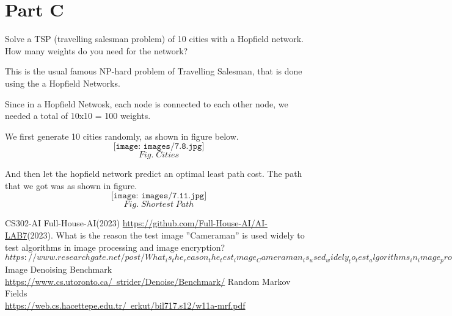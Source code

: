 \documentclass[conference]{IEEEtran}
\begin{document}
\section{Part C} 
Solve a TSP (travelling salesman problem) of 10 cities with
a Hopfield network. How many weights do you need for the
network?

This is the usual famous NP-hard problem of Travelling
Salesman, that is done using the a Hopfield Networks.

Since in a Hopfield Netwosk, each node is connected to
each other node, we needed a total of 10x10 = 100 weights.

We first generate 10 cities randomly, as shown in figure below.
$$\texttt{[image: images/7.8.jpg]}$$
$$Fig. \; Cities $$

And then let the hopfield network predict an optimal least
path cost.
The path that we got was as shown in figure.
$$\texttt{[image: images/7.11.jpg]}$$
$$Fig. \; Shortest \; Path $$
\begin{thebibliography}{}
\bibitem{}
CS302-AI Full-House-AI(2023) \href{https://github.com/Full-House-AI/AI-LAB7}{https://github.com/Full-House-AI/AI-LAB7}(2023).
\bibitem{}
What is the reason the test image ”Cameraman” is used widely
to test algorithms in image processing and image encryption?\\
\href{https://www.researchgate.net/post/What_is_the_reason_the_test_image_Cameraman_is_used_widely_to_test_algorithms_in_image_processing_and_image_encryption}{$https://www.researchgate.net/post/What_is_the_reason_the_test_image_Cameraman_is_used_widely_to_test_algorithms_in_image_processing_and_image_encryption$}
\bibitem{}
Image Denoising Benchmark\\
\href{https://www.cs.utoronto.ca/~strider/Denoise/Benchmark/}{https://www.cs.utoronto.ca/~strider/Denoise/Benchmark/}
\bibitem{}
Random Markov Fields\\
\href{https://web.cs.hacettepe.edu.tr/~erkut/bil717.s12/w11a-mrf.pdf}{https://web.cs.hacettepe.edu.tr/~erkut/bil717.s12/w11a-mrf.pdf}
\end{thebibliography}
\end{document}
